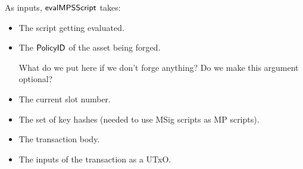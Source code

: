 As inputs, $\mathsf{evalMPSScript}$ takes:

\begin{itemize}
\item The script getting evaluated.
\item The $\mathsf{PolicyID}$ of the asset being forged.
  \begin{note}
    What do we put here if we don't forge anything? Do we make this argument optional?
  \end{note}
\item The current slot number.
\item The set of key hashes (needed to use MSig scripts as MP scripts).
\item The transaction body.
\item The inputs of the transaction as a UTxO.
\end{itemize}


\clearpage
